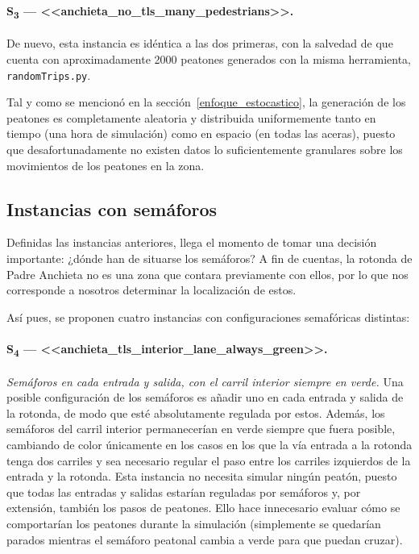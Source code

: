 \paragraph{S\textsubscript{3} --- <<anchieta\_no\_tls\_many\_pedestrians>>.} De nuevo, esta instancia es idéntica a las dos primeras, con la salvedad de que cuenta con aproximadamente 2000 peatones generados con la misma herramienta, \texttt{randomTrips.py}.


Tal y como se mencionó en la sección~\ref{enfoque_estocastico}, la generación de los peatones es completamente aleatoria y distribuida uniformemente tanto en tiempo (una hora de simulación) como en espacio (en todas las aceras), puesto que desafortunadamente no existen datos lo suficientemente granulares sobre los movimientos de los peatones en la zona.


\subsection{Instancias con semáforos}
\label{subsec:instancias}

Definidas las instancias anteriores, llega el momento de tomar una decisión importante: ¿dónde han de situarse los semáforos? A fin de cuentas, la rotonda de Padre Anchieta no es una zona que contara previamente con ellos, por lo que nos corresponde a nosotros determinar la localización de estos.

Así pues, se proponen cuatro instancias con configuraciones semafóricas distintas:

\paragraph{S\textsubscript{4} --- <<anchieta\_tls\_interior\_lane\_always\_green>>.} \textit{Semáforos en cada entrada y salida, con el carril interior siempre en verde.} Una posible configuración de los semáforos es añadir uno en cada entrada y salida de la rotonda, de modo que esté absolutamente regulada por estos. Además, los semáforos del carril interior permanecerían en verde siempre que fuera posible, cambiando de color únicamente en los casos en los que la vía entrada a la rotonda tenga dos carriles y sea necesario regular el paso entre los carriles izquierdos de la entrada y la rotonda. Esta instancia no necesita simular ningún peatón, puesto que todas las entradas y salidas estarían reguladas por semáforos y, por extensión, también los pasos de peatones. Ello hace innecesario evaluar cómo se comportarían los peatones durante la simulación (simplemente se quedarían parados mientras el semáforo peatonal cambia a verde para que puedan cruzar).

